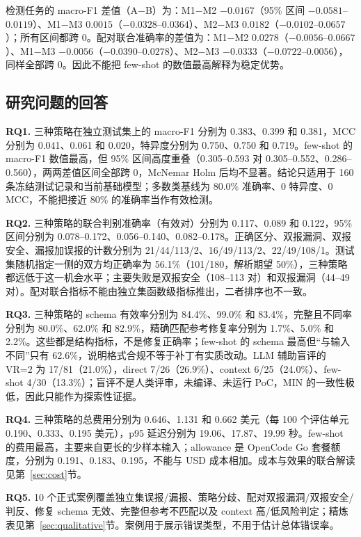 \documentclass[conference]{IEEEtran}
\begin{document}
检测任务的 macro-F1 差值（A−B）为：M1−M2 $-0.0167$（95\% 区间 $-0.0581$--$0.0119$）、M1−M3 $0.0015$（$-0.0328$--$0.0364$）、M2−M3 $0.0182$（$-0.0102$--$0.0657$）；所有区间都跨 0。配对联合准确率的差值为：M1−M2 $0.0278$（$-0.0056$--$0.0667$）、M1−M3 $-0.0056$（$-0.0390$--$0.0278$）、M2−M3 $-0.0333$（$-0.0722$--$0.0056$），同样全部跨 0。因此不能把 few-shot 的数值最高解释为稳定优势。

\subsection{研究问题的回答}
\textbf{RQ1.} 三种策略在独立测试集上的 macro-F1 分别为 0.383、0.399 和 0.381，MCC 分别为 0.041、0.061 和 0.020，特异度分别为 0.750、0.750 和 0.719。few-shot 的 macro-F1 数值最高，但 95\% 区间高度重叠（0.305--0.593 对 0.305--0.552、0.286--0.560），两两差值区间全部跨 0，McNemar Holm 后均不显著。结论只适用于 160 条冻结测试记录和当前基础模型；多数类基线为 80.0\% 准确率、0 特异度、0 MCC，不能把接近 80\% 的准确率当作有效检测。

\textbf{RQ2.} 三种策略的联合判别准确率（有效对）分别为 0.117、0.089 和 0.122，95\% 区间分别为 0.078--0.172、0.056--0.140、0.082--0.178。正确区分、双报漏洞、双报安全、漏报加误报的计数分别为 21/44/113/2、16/49/113/2、22/49/108/1。测试集随机指定一侧的双方均正确率为 56.1\%（101/180，解析期望 50\%），三种策略都远低于这一机会水平；主要失败是双报安全（108--113 对）和双报漏洞（44--49 对）。配对联合指标不能由独立集函数级指标推出，二者排序也不一致。

\textbf{RQ3.} 三种策略的 schema 有效率分别为 84.4\%、99.0\% 和 83.4\%，完整且不同率分别为 80.0\%、62.0\% 和 82.9\%，精确匹配参考修复率分别为 1.7\%、5.0\% 和 2.2\%。这些都是结构指标，不是修复正确率；few-shot 的 schema 最高但“与输入不同”只有 62.6\%，说明格式合规不等于补丁有实质改动。LLM 辅助盲评的 VR=2 为 17/81（21.0\%），direct 7/26（26.9\%）、context 6/25（24.0\%）、few-shot 4/30（13.3\%）；盲评不是人类评审，未编译、未运行 PoC，MIN 的一致性极低，因此只能作为探索性证据。

\textbf{RQ4.} 三种策略的总费用分别为 0.646、1.131 和 0.662 美元（每 100 个评估单元 0.190、0.333、0.195 美元），p95 延迟分别为 19.06、17.87、19.99 秒。few-shot 的费用最高，主要来自更长的少样本输入；allowance 是 OpenCode Go 套餐额度，分别为 0.191、0.183、0.195，不能与 USD 成本相加。成本与效果的联合解读见第~\ref{sec:cost}节。

\textbf{RQ5.} 10 个正式案例覆盖独立集误报/漏报、策略分歧、配对双报漏洞/双报安全/判反、修复 schema 无效、完整但参考不匹配以及 context 高/低风险判定；精炼表见第~\ref{sec:qualitative}节。案例用于展示错误类型，不用于估计总体错误率。
\end{document}
